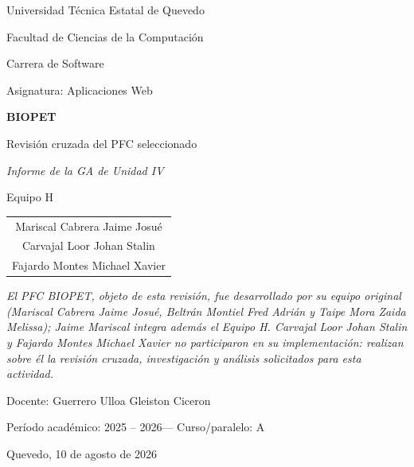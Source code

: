 \documentclass[12pt,a4paper]{report}
\newcommand{\universidad}{Universidad T\'ecnica Estatal de Quevedo}
\newcommand{\facultad}{Facultad de Ciencias de la Computaci\'on}
\newcommand{\carrera}{Carrera de Software}
\newcommand{\asignatura}{Aplicaciones Web}
\newcommand{\docente}{Guerrero Ulloa Gleiston Ciceron}
\newcommand{\periodoacademico}{2025 -- 2026}
\newcommand{\cursoparalelo}{A}
\newcommand{\equipoga}{Equipo H}
\newcommand{\ciudadfecha}{Quevedo, 10 de agosto de 2026}
\begin{document}
\begin{titlepage}
  \centering
  \vspace*{0.5cm}

  {\large \universidad \par}
  {\large \facultad \par}
  \vspace{0.3cm}
  {\normalsize \carrera \par}
  {\normalsize Asignatura: \asignatura \par}

  \vspace{2.2cm}
  {\Huge \bfseries BIOPET \par}
  \vspace{0.4cm}
  {\Large Revisi\'on cruzada del PFC seleccionado \par}
  \vspace{0.6cm}
  {\Large\itshape Informe de la GA de Unidad IV \par}

  \vspace{2.0cm}
  {\large \equipoga \par}
  \vspace{0.6cm}

  {\normalsize
    \begin{tabular}{c}
      Mariscal Cabrera Jaime Josu\'e \\
      Carvajal Loor Johan Stalin \\
      Fajardo Montes Michael Xavier \\
    \end{tabular}
    \par
  }

  \vspace{1.2cm}
  {\small\itshape
    El PFC BIOPET, objeto de esta revisi\'on, fue desarrollado por su
    equipo original (Mariscal Cabrera Jaime Josu\'e, Beltr\'an Montiel
    Fred Adri\'an y Taipe Mora Zaida Melissa); Jaime Mariscal integra
    adem\'as el \equipoga. Carvajal Loor Johan Stalin y Fajardo Montes
    Michael Xavier no participaron en su implementaci\'on: realizan
    sobre \'el la revisi\'on cruzada, investigaci\'on y an\'alisis
    solicitados para esta actividad. \par
  }

  \vspace{1.6cm}
  {\normalsize Docente: \docente \par}
  \vspace{0.3cm}
  {\normalsize Per\'iodo acad\'emico: \periodoacademico \quad --- \quad Curso/paralelo: \cursoparalelo \par}

  \vfill

  {\normalsize \ciudadfecha \par}
  \vspace{0.5cm}

\end{titlepage}
\end{document}
